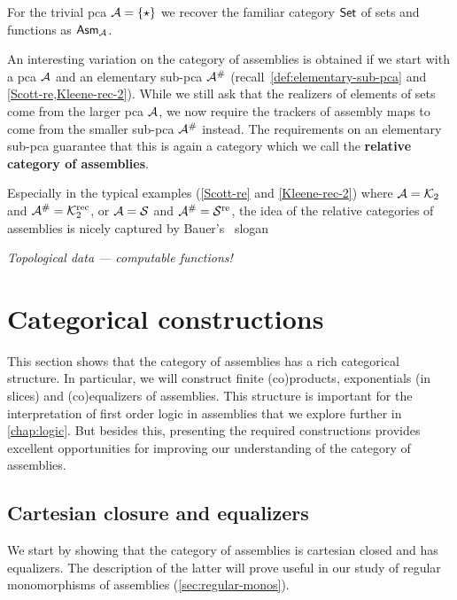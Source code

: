 \begin{example}
  For the trivial pca \(\AA = \set{\singleton}\) we recover the familiar
  category \(\Set\) of sets and functions as \(\Asm{\AA}\).
\end{example}

\begin{remark}
  An interesting variation on the category of assemblies is obtained if we start
  with a pca \(\AA\) and an elementary sub-pca \(\AA^\#\)
  (recall~\cref{def:elementary-sub-pca} and \cref{Scott-re,Kleene-rec-2}).
  While we still ask that the realizers of elements of sets come from the
  larger pca \(\AA\), we now require the trackers of assembly maps to come from
  the smaller sub-pca \(\AA^\#\) instead.
  The requirements on an elementary sub-pca guarantee that this is again a
  category which we call the \textbf{relative category of assemblies}.

  Especially in the typical examples (\ref{Scott-re} and \ref{Kleene-rec-2})
  where \(\AA = \Ktwo\) and \(\AA^\# = \Ktworec\), or \(\AA = \Scott\) and
  \(\AA^\# = \Scottre\), the idea of the relative categories of assemblies is
  nicely captured by Bauer's~\cite[p.~36 and 45]{Bauer2006,Bauer2023}
  slogan
  \begin{center}
    \emph{Topological data --- computable functions!}
  \end{center}
\end{remark}

\section{Categorical constructions}

This section shows that the category of assemblies has a rich categorical
structure. In particular, we will construct finite (co)products, exponentials
(in slices) and (co)equalizers of assemblies.
%
This structure is important for the interpretation of first order logic in
assemblies that we explore further in \cref{chap:logic}.
%
But besides this, presenting the required constructions provides excellent
opportunities for improving our understanding of the category of assemblies.

\subsection{Cartesian closure and equalizers}
We start by showing that the category of assemblies is cartesian closed and has
equalizers. The description of the latter will prove useful in our study of
regular monomorphisms of assemblies (\cref{sec:regular-monos}).

